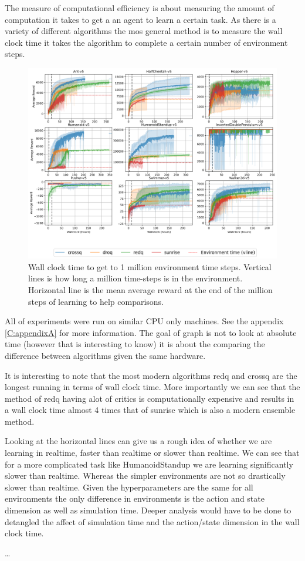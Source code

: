 The measure of computational efficiency is about measuring the amount of computation it takes to get a an agent to learn a certain task. As there is a variety of different algorithms the mos general method is to measure the wall clock time it takes the algorithm to complete a certain number of environment steps.

\begin{figure}[H]
    \centering
    \includegraphics[width=1\textwidth]{figures/wall_clock_results.png}
    \caption{Wall clock time to get to 1 million environment time steps. Vertical lines is how long a million time-steps is in the environment. Horizontal line is the mean average reward at the end of the million steps of learning to help comparisons.}
    \label{fig:sample_efficiency}
\end{figure}

All of experiments were run on similar CPU only machines. See the appendix \ref{C:appendixA} for more information. The goal of graph is not to look at absolute time (however that is interesting to know) it is about the comparing the difference between algorithms given the same hardware.

It is interesting to note that the most modern algorithms redq and crossq are the longest running in terms of wall clock time. More importantly we can see that the method of redq having alot of critics is computationally expensive and results in a wall clock time almost 4 times that of sunrise which is also a modern ensemble method.

Looking at the horizontal lines can give us a rough idea of whether we are learning in realtime, faster than realtime or slower than realtime. We can see that for a more complicated task like HumanoidStandup we are learning significantly slower than realtime. Whereas the simpler environments are not so drastically slower than realtime. Given the hyperparameters are the same for all environments the only difference in environments is the action and state dimension as well as simulation time. Deeper analysis would have to be done to detangled the affect of simulation time and the action/state dimension in the wall clock time.

\dots
